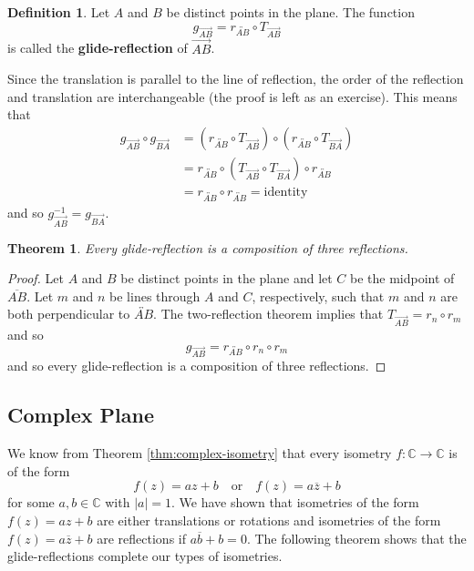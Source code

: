 \documentclass[
]{book}
\newtheorem{theorem}{Theorem}[chapter]
\theoremstyle{definition}
\newtheorem{definition}{Definition}[chapter]
\theoremstyle{definition}
\theoremstyle{definition}
\theoremstyle{definition}
\theoremstyle{remark}
\begin{document}
\begin{definition}
Let \(A\) and \(B\) be distinct points in the plane. The function \[g_{\overrightarrow{AB}} = r_{\overleftrightarrow{AB}} \circ T_{\overrightarrow{AB}}\] is called the \textbf{glide-reflection} of \(\overrightarrow{AB}\).
\end{definition}

Since the translation is parallel to the line of reflection, the order of the reflection and translation are interchangeable (the proof is left as an exercise). This means that
\begin{align*}
g_{\overrightarrow{AB}} \circ g_{\overrightarrow{BA}} & = \left( r_{\overleftrightarrow{AB}} \circ T_{\overrightarrow{AB}}\right) \circ \left( r_{\overleftrightarrow{AB}} \circ T_{\overrightarrow{BA}}\right) \\
& = r_{\overleftrightarrow{AB}} \circ \left( T_{\overrightarrow{AB}} \circ T_{\overrightarrow{BA}}\right) \circ  r_{\overleftrightarrow{AB}} \\
& =  r_{\overleftrightarrow{AB}} \circ r_{\overleftrightarrow{AB}} = \mbox{identity}
\end{align*}
and so \(g_{\overrightarrow{AB}}^{-1} = g_{\overrightarrow{BA}}\).

\begin{theorem}
Every glide-reflection is a composition of three reflections.
\end{theorem}

\begin{proof}
Let \(A\) and \(B\) be distinct points in the plane and let \(C\) be the midpoint of \(\overline{AB}\). Let \(m\) and \(n\) be lines through \(A\) and \(C\), respectively, such that \(m\) and \(n\) are both perpendicular to \(\overleftrightarrow{AB}\). The two-reflection theorem implies that \(T_{\overrightarrow{AB}}= r_n \circ r_m\) and so
\[g_{\overrightarrow{AB}}= r_{\overleftrightarrow{AB}} \circ r_n \circ r_m\] and so every glide-reflection is a composition of three reflections.
\end{proof}

\hypertarget{complex-plane-4}{%
\subsection{Complex Plane}\label{complex-plane-4}}

We know from Theorem \ref{thm:complex-isometry} that every isometry \(f:\mathbb{C}\rightarrow \mathbb{C}\) is of the form
\[f(z)=az+b \quad \mbox{or} \quad f(z)=a\overline{z}+b\] for some \(a,b\in \mathbb{C}\) with \(|a|=1\). We have shown that isometries of the form \(f(z)=az+b\) are either translations or rotations and isometries of the form \(f(z)=a\overline{z}+b\) are reflections if \(a\overline{b}+b=0\). The following theorem shows that the glide-reflections complete our types of isometries.
\end{document}
